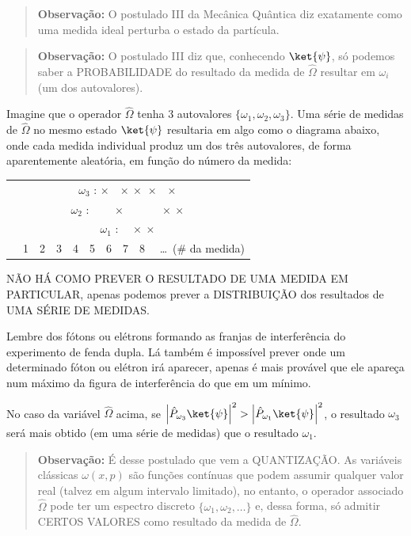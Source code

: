 \begin{quote}
\textbf{Observação:} O postulado III da Mecânica Quântica diz exatamente como uma medida ideal perturba o estado da partícula.
\end{quote}

\begin{quote}
\textbf{Observação:} O postulado III diz que, conhecendo $\ket{\psi}$, só podemos saber a PROBABILIDADE do resultado da medida de $\hat{\Omega}$ resultar em $\omega_i$ (um dos autovalores).
\end{quote}

Imagine que o operador $\hat{\Omega}$ tenha 3 autovalores $\{\omega_1, \omega_2, \omega_3\}$. Uma série de medidas de $\hat{\Omega}$ no mesmo estado $\ket{\psi}$ resultaria em algo como o diagrama abaixo, onde cada medida individual produz um dos três autovalores, de forma aparentemente aleatória, em função do número da medida:

\begin{center}
\begin{tabular}{c}
$\omega_3$ : $\times$\quad\ \ $\times\ \times\ \times\ \ \ \times$\\
$\omega_2$ : \ \ \ \ $\times$\ \ \quad\quad\ \ \ \ \ $\times\ \times$\\
$\omega_1$ : \ \ \quad\quad$\times\ \times$\\
\qquad\ \ 1\ \ 2\ \ 3\ \ 4\ \ 5\ \ 6\ \ 7\ \ 8 \ \ \ldots\ (\# da medida)
\end{tabular}
\end{center}

NÃO HÁ COMO PREVER O RESULTADO DE UMA MEDIDA EM PARTICULAR, apenas podemos prever a DISTRIBUIÇÃO dos resultados de UMA SÉRIE DE MEDIDAS.

Lembre dos fótons ou elétrons formando as franjas de interferência do experimento de fenda dupla. Lá também é impossível prever onde um determinado fóton ou elétron irá aparecer, apenas é mais provável que ele apareça num máximo da figura de interferência do que em um mínimo.

No caso da variável $\hat{\Omega}$ acima, se $\left|\hat{P}_{\omega_3}\ket{\psi}\right|^2 > \left|\hat{P}_{\omega_1}\ket{\psi}\right|^2$, o resultado $\omega_3$ será mais obtido (em uma série de medidas) que o resultado $\omega_1$.

\begin{quote}
\textbf{Observação:} É desse postulado que vem a QUANTIZAÇÃO. As variáveis clássicas $\omega(x,p)$ são funções contínuas que podem assumir qualquer valor real (talvez em algum intervalo limitado), no entanto, o operador associado $\hat{\Omega}$ pode ter um espectro discreto $\{\omega_1, \omega_2, \dots\}$ e, dessa forma, só admitir CERTOS VALORES como resultado da medida de $\hat{\Omega}$.
\end{quote}


